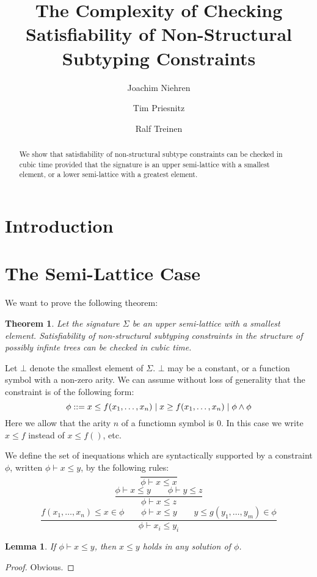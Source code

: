 \documentclass[11pt]{article}
\title{The Complexity of Checking Satisfiability of Non-Structural
  Subtyping Constraints}
\author{Joachim Niehren \and Tim Priesnitz \and Ralf Treinen}
\newtheorem{satz}{Theorem}
\newtheorem{lemma}{Lemma}
\begin{document}
\maketitle

\begin{abstract}
  We show that satisfiability of non-structural subtype constraints
  can be checked in cubic time provided that the signature is an upper
  semi-lattice with a smallest element, or a lower semi-lattice with a
  greatest element.
\end{abstract}

\section{Introduction}

\section{The Semi-Lattice Case}

We want to prove the following theorem:

\begin{satz}
\label{uppersemilatice}
Let the signature $\Sigma$ be an upper semi-lattice with a smallest
element. Satisfiability of non-structural subtyping constraints in the
structure of possibly infinte trees can be checked in cubic time.
\end{satz}

Let $\bot$ denote the smallest element of $\Sigma$. $\bot$ may be a
constant, or a function symbol with a non-zero arity. We can assume
without loss of generality that the constraint is of the following
form:
\[
\phi ::= x \leq f(x_1,\ldots,x_n) \mid x \geq f(x_1,\ldots,x_n) \mid \phi \wedge \phi
\]
Here we allow that the arity $n$ of a functiomn symbol is $0$. In this
case we write $x \leq f$ instead of $x \leq f()$, etc.

We define the set of inequations which are syntactically supported by
a constraint $\phi$, written $\phi \vdash x \leq y$, by the following
rules:
\[ \frac{}{\phi \vdash x \leq x}\]
\[ \frac{\phi \vdash x \leq y \qquad \phi \vdash y \leq z}{\phi \vdash
  x \leq z} \]
\[ \frac{f(x_1,\ldots,x_n)\leq x \in \phi
  \qquad \phi \vdash x \leq y
  \qquad y \leq g(y_1,\ldots,y_m) \in \phi}{\phi \vdash x_i \leq
  y_i}\]

\begin{lemma}
  If $\phi\vdash x\leq y$, then $x\leq y$ holds in any solution of
  $\phi$.
\end{lemma}
\begin{proof}
Obvious.
\end{proof}
\end{document}
